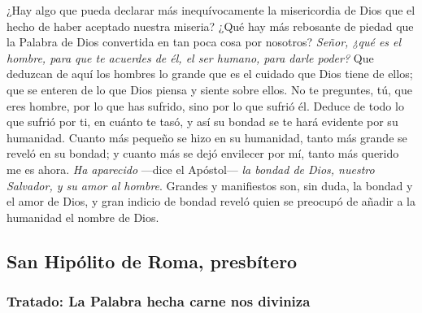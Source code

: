 \begin{body}
	¿Hay algo que pueda declarar más inequívocamente la misericordia de Dios que el hecho de haber aceptado nuestra miseria? ¿Qué hay más rebosante de piedad que la Palabra de Dios convertida en tan poca cosa por nosotros? \emph{Señor, ¿qué es el hombre, para que te acuerdes de él, el ser humano, para darle poder?} Que deduzcan de aquí los hombres lo grande que es el cuidado que Dios tiene de ellos; que se enteren de lo que Dios piensa y siente sobre ellos. No te preguntes, tú, que eres hombre, por lo que has sufrido, sino por lo que sufrió él. Deduce de todo lo que sufrió por ti, en cuánto te tasó, y así su bondad se te hará evidente por su humanidad. Cuanto más pequeño se hizo en su humanidad, tanto más grande se reveló en su bondad; y cuanto más se dejó envilecer por mí, tanto más querido me es ahora. \emph{Ha aparecido} ---dice el Apóstol--- \emph{la bondad de Dios, nuestro Salvador, y su amor al hombre}. Grandes y manifiestos son, sin duda, la bondad y el amor de Dios, y gran indicio de bondad reveló quien se preocupó de añadir a la humanidad el nombre de Dios.
\end{body}

\newsection

\subsection{San Hipólito de Roma, presbítero}

\subsubsection{Tratado: La Palabra hecha carne nos diviniza}


